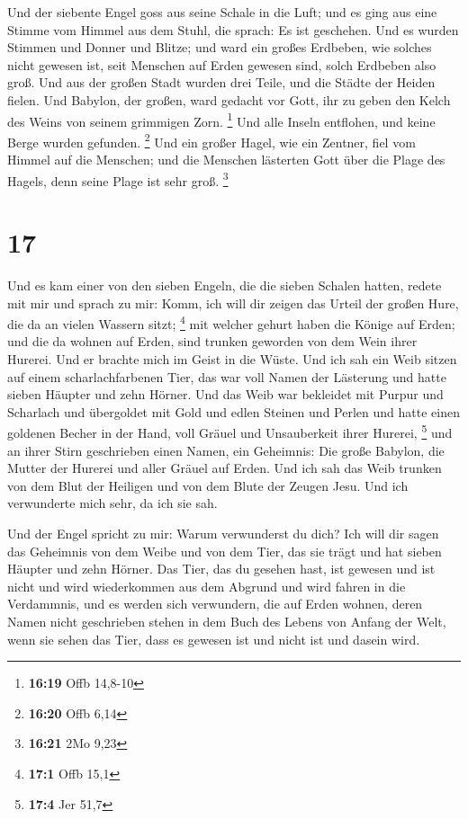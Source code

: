 Und der siebente Engel goss aus seine Schale in die
Luft; und es ging aus eine Stimme vom Himmel aus dem Stuhl, die sprach:
Es ist geschehen.  Und es wurden Stimmen und Donner und
Blitze; und ward ein großes Erdbeben, wie solches nicht gewesen ist,
seit Menschen auf Erden gewesen sind, solch Erdbeben also groß.
 Und aus der großen Stadt wurden drei Teile, und die
Städte der Heiden fielen. Und Babylon, der großen, ward gedacht vor
Gott, ihr zu geben den Kelch des Weins von seinem grimmigen Zorn.
\footnote{\textbf{16:19} Offb 14,8-10}  Und alle Inseln
entflohen, und keine Berge wurden gefunden. \footnote{\textbf{16:20}
  Offb 6,14}  Und ein großer Hagel, wie ein Zentner, fiel
vom Himmel auf die Menschen; und die Menschen lästerten Gott über die
Plage des Hagels, denn seine Plage ist sehr groß. \footnote{\textbf{16:21}
  2Mo 9,23}

\hypertarget{section-6}{%
\section{17}\label{section-6}}

 Und es kam einer von den sieben Engeln, die die sieben
Schalen hatten, redete mit mir und sprach zu mir: Komm, ich will dir
zeigen das Urteil der großen Hure, die da an vielen Wassern sitzt;
\footnote{\textbf{17:1} Offb 15,1}  mit welcher gehurt
haben die Könige auf Erden; und die da wohnen auf Erden, sind trunken
geworden von dem Wein ihrer Hurerei.  Und er brachte mich
im Geist in die Wüste. Und ich sah ein Weib sitzen auf einem
scharlachfarbenen Tier, das war voll Namen der Lästerung und hatte
sieben Häupter und zehn Hörner.  Und das Weib war
bekleidet mit Purpur und Scharlach und übergoldet mit Gold und edlen
Steinen und Perlen und hatte einen goldenen Becher in der Hand, voll
Gräuel und Unsauberkeit ihrer Hurerei, \footnote{\textbf{17:4} Jer 51,7}
 und an ihrer Stirn geschrieben einen Namen, ein
Geheimnis: Die große Babylon, die Mutter der Hurerei und aller Gräuel
auf Erden.  Und ich sah das Weib trunken von dem Blut der
Heiligen und von dem Blute der Zeugen Jesu. Und ich verwunderte mich
sehr, da ich sie sah.

 Und der Engel spricht zu mir: Warum verwunderst du dich?
Ich will dir sagen das Geheimnis von dem Weibe und von dem Tier, das sie
trägt und hat sieben Häupter und zehn Hörner.  Das Tier,
das du gesehen hast, ist gewesen und ist nicht und wird wiederkommen aus
dem Abgrund und wird fahren in die Verdammnis, und es werden sich
verwundern, die auf Erden wohnen, deren Namen nicht geschrieben stehen
in dem Buch des Lebens von Anfang der Welt, wenn sie sehen das Tier,
dass es gewesen ist und nicht ist und dasein wird.


